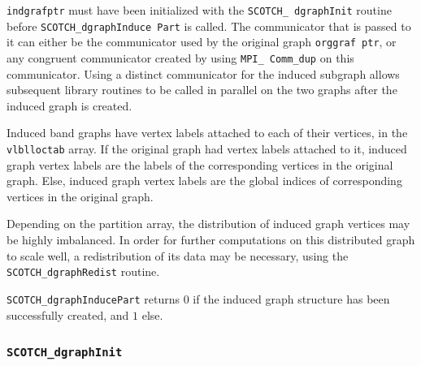 \begin{itemize}
{\tt indgrafptr} must have been initialized with the {\tt SCOTCH\_\lbt
dgraph\lbt Init} routine before {\tt SCOTCH\_dgraph\lbt Induce\lbt
Part} is called. The communicator that is passed to it can either be
the communicator used by the original graph {\tt org\lbt graf\lbt
ptr}, or any congruent communicator created by using {\tt MPI\_\lbt
Comm\_\lbt dup} on this communicator. Using a distinct communicator
for the induced subgraph allows subsequent library routines to be
called in parallel on the two graphs after the induced graph is
created.

Induced band graphs have vertex labels attached to each of their
vertices, in the {\tt vlbl\lbt loc\lbt tab} array. If the original
graph had vertex labels attached to it, induced graph vertex labels
are the labels of the corresponding vertices in the original
graph. Else, induced graph vertex labels are the global indices of
corresponding vertices in the original graph.

Depending on the partition array, the distribution of induced graph
vertices may be highly imbalanced. In order for further computations
on this distributed graph to scale well, a redistribution of its data
may be necessary, using the {\tt SCOTCH\_dgraph\lbt Redist} routine.

\progret

{\tt SCOTCH\_dgraphInducePart} returns $0$ if the induced graph
structure has been successfully created, and $1$ else.
\end{itemize}

\subsubsection{{\tt SCOTCH\_dgraphInit}}
\label{sec-lib-dgraphinit}

